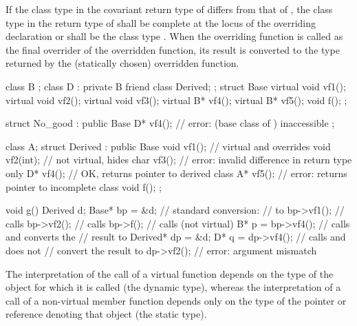 \pnum
If the class type in the covariant return type of  differs from that of
, the class type in the return type of  shall be
complete at the locus of the overriding declaration or shall be the
class type . When the overriding function is called as the
final overrider of the overridden function, its result is converted to
the type returned by the (statically chosen) overridden
function.
\begin{example}
\begin{codeblock}
class B { };
class D : private B { friend class Derived; };
struct Base {
  virtual void vf1();
  virtual void vf2();
  virtual void vf3();
  virtual B*   vf4();
  virtual B*   vf5();
  void f();
};

struct No_good : public Base {
  D*  vf4();        // error:  (base class of ) inaccessible
};

class A;
struct Derived : public Base {
    void vf1();     // virtual and overrides 
    void vf2(int);  // not virtual, hides 
    char vf3();     // error: invalid difference in return type only
    D*   vf4();     // OK, returns pointer to derived class
    A*   vf5();     // error: returns pointer to incomplete class
    void f();
};

void g() {
  Derived d;
  Base* bp = &d;                // standard conversion:
                                //  to 
  bp->vf1();                    // calls 
  bp->vf2();                    // calls 
  bp->f();                      // calls  (not virtual)
  B*  p = bp->vf4();            // calls  and converts the
                                // result to 
  Derived*  dp = &d;
  D*  q = dp->vf4();            // calls  and does not
                                // convert the result to 
  dp->vf2();                    // error: argument mismatch
}
\end{codeblock}
\end{example}

\pnum
\begin{note}
The interpretation of the call of a virtual function depends on the type
of the object for which it is called (the dynamic type), whereas the
interpretation of a call of a non-virtual member function depends only
on the type of the pointer or reference denoting that object (the static
type).
\end{note}

